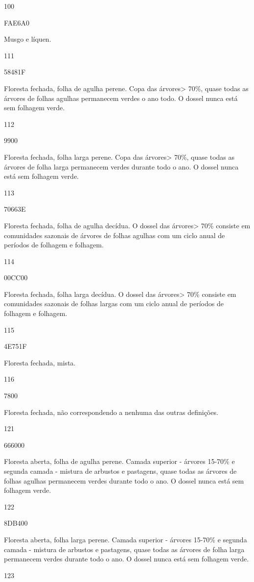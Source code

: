 \documentclass[
  portuguese,
]{krantz}
\begin{document}
100

FAE6A0

Musgo e líquen.

111

58481F

Floresta fechada, folha de agulha perene. Copa das árvores\textgreater{} 70\%, quase todas as árvores de folhas agulhas permanecem verdes o ano todo. O dossel nunca está sem folhagem verde.

112

9900

Floresta fechada, folha larga perene. Copa das árvores\textgreater{} 70\%, quase todas as árvores de folha larga permanecem verdes durante todo o ano. O dossel nunca está sem folhagem verde.

113

70663E

Floresta fechada, folha de agulha decídua. O dossel das árvores\textgreater{} 70\% consiste em comunidades sazonais de árvores de folhas agulhas com um ciclo anual de períodos de folhagem e folhagem.

114

00CC00

Floresta fechada, folha larga decídua. O dossel das árvores\textgreater{} 70\% consiste em comunidades sazonais de folhas largas com um ciclo anual de períodos de folhagem e folhagem.

115

4E751F

Floresta fechada, mista.

116

7800

Floresta fechada, não correspondendo a nenhuma das outras definições.

121

666000

Floresta aberta, folha de agulha perene. Camada superior - árvores 15-70\% e segunda camada - mistura de arbustos e pastagens, quase todas as árvores de folhas agulhas permanecem verdes durante todo o ano. O dossel nunca está sem folhagem verde.

122

8DB400

Floresta aberta, folha larga perene. Camada superior - árvores 15-70\% e segunda camada - mistura de arbustos e pastagens, quase todas as árvores de folha larga permanecem verdes durante todo o ano. O dossel nunca está sem folhagem verde.

123
\end{document}
